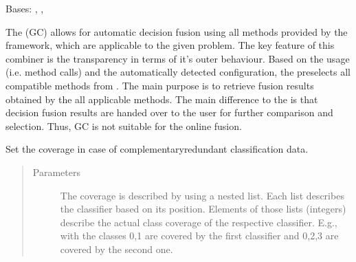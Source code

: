\documentclass[letterpaper,10pt,english]{sphinxmanual}
\begin{document}
\begin{fulllineitems}
\label{\detokenize{pusion.auto.generic_combiner:pusion.auto.generic_combiner.GenericCombiner}}
\sphinxAtStartPar
Bases: {\hyperref[\detokenize{pusion.core.combiner:pusion.core.combiner.TrainableCombiner}]{}}, {\hyperref[\detokenize{pusion.core.combiner:pusion.core.combiner.EvidenceBasedCombiner}]{}}, {\hyperref[\detokenize{pusion.core.combiner:pusion.core.combiner.UtilityBasedCombiner}]{}}

\sphinxAtStartPar
The  (GC) allows for automatic decision fusion using all methods provided by the framework, which
are applicable to the given problem. The key feature of this combiner is the transparency in terms of it’s outer
behaviour. Based on the usage (i.e. method calls) and the automatically detected configuration,
the  preselects all compatible methods from . The main purpose is to retrieve fusion
results obtained by the all applicable methods. The main difference to the  is that decision fusion
results are handed over to the user for further comparison and selection. Thus, GC is not suitable for
the online fusion.

\begin{fulllineitems}
\label{\detokenize{pusion.auto.generic_combiner:pusion.auto.generic_combiner.GenericCombiner.set_coverage}}
\sphinxAtStartPar
Set the coverage in case of complementary\sphinxhyphen{}redundant classification data.
\begin{quote}\begin{description}
\item[{Parameters}] \leavevmode
\sphinxAtStartPar
{} \textendash{} The coverage is described by using a nested list. Each list describes the classifier based on
its position. Elements of those lists (integers) describe the actual class coverage of the respective
classifier. E.g., with \sphinxcode{\sphinxupquote{{[}{[}0,1{]}, {[}0,2,3{]}{]}}} the classes 0,1 are covered by the first classifier and
0,2,3 are covered by the second one.


\end{description}
\end{quote}
\end{fulllineitems}
\end{fulllineitems}
\end{document}
